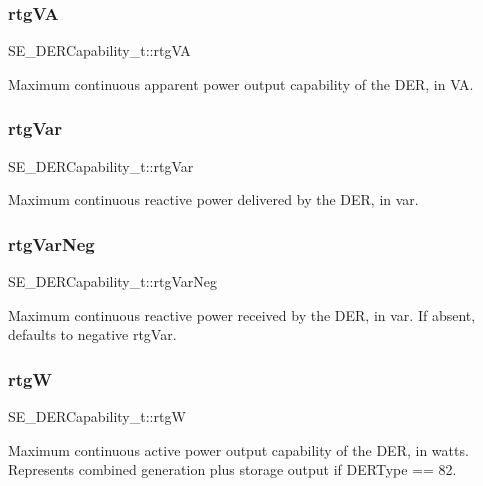 \subsubsection{\texorpdfstring{rtg\+VA}{rtgVA}}
{\footnotesize\ttfamily S\+E\+\_\+\+D\+E\+R\+Capability\+\_\+t\+::rtg\+VA}

Maximum continuous apparent power output capability of the D\+ER, in VA. \mbox{\label{group__DERCapability_ga626f569c239b41de4d007fddb01de132}} 
\subsubsection{\texorpdfstring{rtg\+Var}{rtgVar}}
{\footnotesize\ttfamily S\+E\+\_\+\+D\+E\+R\+Capability\+\_\+t\+::rtg\+Var}

Maximum continuous reactive power delivered by the D\+ER, in var. \mbox{\label{group__DERCapability_ga3bbef4aacb8b26a315f24bb5a9b26deb}} 
\subsubsection{\texorpdfstring{rtg\+Var\+Neg}{rtgVarNeg}}
{\footnotesize\ttfamily S\+E\+\_\+\+D\+E\+R\+Capability\+\_\+t\+::rtg\+Var\+Neg}

Maximum continuous reactive power received by the D\+ER, in var. If absent, defaults to negative rtg\+Var. \mbox{\label{group__DERCapability_gabb04b932aebcf4b908bee4d1e9b81f13}} 
\subsubsection{\texorpdfstring{rtgW}{rtgW}}
{\footnotesize\ttfamily S\+E\+\_\+\+D\+E\+R\+Capability\+\_\+t\+::rtgW}

Maximum continuous active power output capability of the D\+ER, in watts. Represents combined generation plus storage output if D\+E\+R\+Type == 82. \mbox{\label{group__DERCapability_gad7168b19a76c0dc8b404801be524bff4}} 

